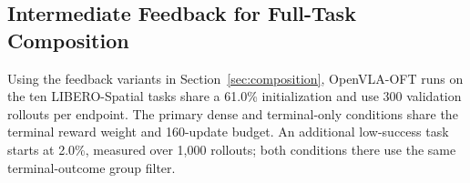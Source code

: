 \subsection{Intermediate Feedback for Full-Task Composition}\label{sec:libero_results}
Using the feedback variants in Section~\ref{sec:composition}, OpenVLA-OFT runs on the ten LIBERO-Spatial tasks share a 61.0\% initialization and use 300 validation rollouts per endpoint. The primary dense and terminal-only conditions share the terminal reward weight and 160-update budget. An additional low-success task starts at 2.0\%, measured over 1,000 rollouts; both conditions there use the same terminal-outcome group filter.
